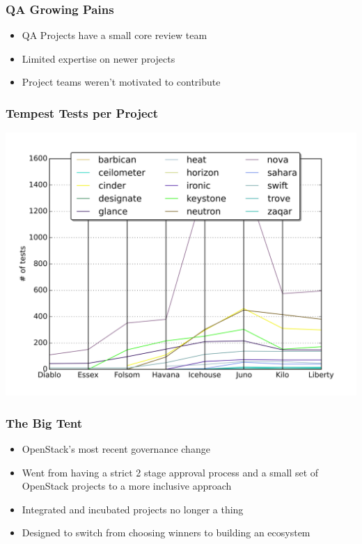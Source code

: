 \documentclass[aspectratio=43,11pt,hyperref={colorlinks=true}]{beamer}
\begin{document}
\begin{frame}
    \frametitle{QA Growing Pains}
    \begin{itemize}
        \item QA Projects have a small core review team
        \item Limited expertise on newer projects
        \item Project teams weren't motivated to contribute
    \end{itemize}
\end{frame}

\begin{frame}
    \frametitle{Tempest Tests per Project}
    \begin{center}
        \includegraphics[width=.95\textwidth]{tests_per_proj.png}
    \end{center}
\end{frame}

\begin{frame}
    \frametitle{The Big Tent}
    \begin{itemize}
        \item OpenStack's most recent governance change
        \item Went from having a strict 2 stage approval process and a small
            set of OpenStack projects to a more inclusive approach
        \item Integrated and incubated projects no longer a thing
        \item Designed to switch from choosing winners to building an ecosystem
    \end{itemize}
\end{frame}
\end{document}

